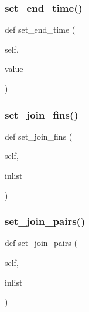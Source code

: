 \subsubsection{\texorpdfstring{set\_end\_time()}{set\_end\_time()}}
{\footnotesize\ttfamily def set\+\_\+end\+\_\+time (\begin{DoxyParamCaption}\item[{}]{self,  }\item[{}]{value }\end{DoxyParamCaption})}

\mbox{\label{classdynamicfilterapp_1_1models_1_1_i_p___pair_a2469f89d3ff5860060ad5d6ee5bed6aa}} 
\subsubsection{\texorpdfstring{set\_join\_fins()}{set\_join\_fins()}}
{\footnotesize\ttfamily def set\+\_\+join\+\_\+fins (\begin{DoxyParamCaption}\item[{}]{self,  }\item[{}]{inlist }\end{DoxyParamCaption})}

\mbox{\label{classdynamicfilterapp_1_1models_1_1_i_p___pair_a7e9ff2535b53d8ece5a3f55f2abe05ed}} 
\subsubsection{\texorpdfstring{set\_join\_pairs()}{set\_join\_pairs()}}
{\footnotesize\ttfamily def set\+\_\+join\+\_\+pairs (\begin{DoxyParamCaption}\item[{}]{self,  }\item[{}]{inlist }\end{DoxyParamCaption})}

\mbox{\label{classdynamicfilterapp_1_1models_1_1_i_p___pair_a53675dee30c576ef2c5dd654017626b1}} 
